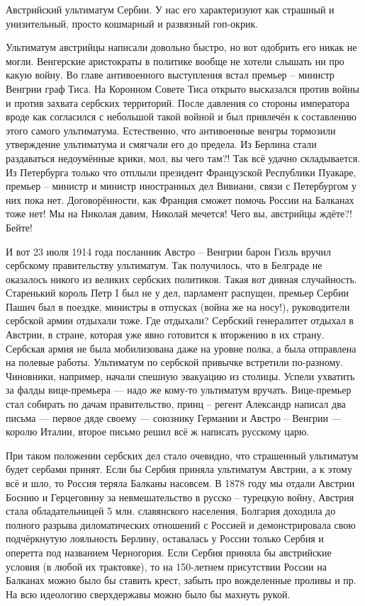 Австрийский ультиматум Сербии. У нас его характеризуют как страшный и
унизительный, просто кошмарный и развязный гоп-окрик.

Ультиматум австрийцы написали довольно быстро, но вот одобрить его никак не
могли. Венгерские аристократы в политике вообще не хотели слышать ни про какую
войну. Во главе антивоенного выступления встал премьер -- министр Венгрии граф
Тиса. На Коронном Совете Тиса открыто высказался против войны и против захвата
сербских территорий. После давления со стороны императора вроде как согласился
с небольшой такой войной и был привлечён к составлению этого самого ультиматума.
Естественно, что антивоенные венгры тормозили утверждение ультиматума и смягчали
его до предела. Из Берлина стали раздаваться недоумённые крики, мол, вы чего
там?! Так всё удачно складывается. Из Петербурга только что отплыли президент
Французской Республики Пуакаре, премьер -- министр и министр иностранных дел
Вивиани, связи с Петербургом у них пока нет. Договорённости, как Франция сможет
помочь России на Балканах тоже нет! Мы на Николая давим, Николай мечется! Чего
вы, австрийцы ждёте?! Бейте!

И вот 23 июля 1914 года посланник Австро -- Венгрии барон Гизль вручил сербскому
правительству ультиматум. Так получилось, что в Белграде не оказалось никого из
великих сербских политиков. Такая вот дивная случайность. Старенький король
Петр I был не у дел, парламент распущен, премьер Сербии Пашич был в поездке,
министры в отпусках (война же на носу!), руководители сербской армии отдыхали
тоже. Где отдыхали? Сербский генералитет отдыхал в Австрии, в стране, которая
уже явно готовится к вторжению в их страну. Сербская армия не была мобилизована
даже на уровне полка, а была отправлена на полевые работы. Ультиматум по
сербской привычке встретили по-разному. Чиновники, например, начали спешную
эвакуацию из столицы. Успели ухватить за фалды  вице-премьера --- надо же
кому-то ультиматум вручать. Вице-премьер стал собирать по дачам правительство,
принц -- регент Александр написал два письма --- первое дяде своему --- союзнику
Германии и Австро -- Венгрии --- королю Италии, второе письмо решил всё ж написать
русскому царю.

При таком положении сербских дел стало очевидно, что страшенный ультиматум будет
сербами принят. Если бы Сербия приняла ультиматум Австрии, а к этому всё и шло,
то Россия теряла Балканы насовсем. В 1878 году мы отдали Австрии Боснию и
Герцеговину за невмешательство в русско -- турецкую войну, Австрия стала
обладательницей 5 млн. славянского населения, Болгария доходила до полного
разрыва диломатических отношений с Россией и демонстрировала свою подчёркнутую
лояльность Берлину, оставалась у России только Сербия и оперетта под названием
Черногория. Если Сербия приняла бы австрийские условия (в любой их трактовке),
то на 150-летнем присутствии России на Балканах можно было бы ставить крест,
забыть про вожделенные проливы и пр. На всю идеологию сверхдержавы можно было
бы махнуть рукой.


